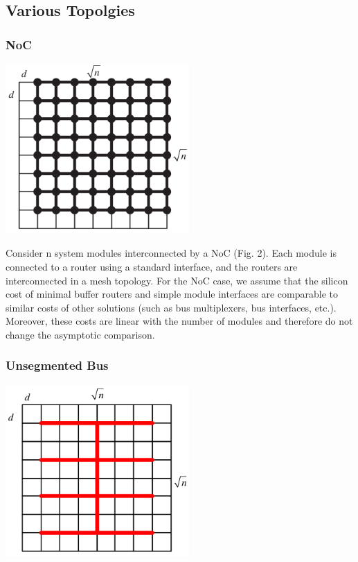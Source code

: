 \subsection{Various Topolgies}


\subsubsection{NoC}

\includegraphics[width=7cm]{images/3}\cite{Bolotin:2004:CCN:1056481.1056484}%

Consider n system modules interconnected by a NoC (Fig. 2). Each module
is connected to a router using a standard interface, and the routers
are interconnected in a mesh topology. For the NoC case, we assume
that the silicon cost of minimal buffer routers and simple module
interfaces are comparable to similar costs of other solutions (such
as bus multiplexers, bus interfaces, etc.). Moreover, these costs
are linear with the number of modules and therefore do not change
the asymptotic comparison. 


\subsubsection{Unsegmented Bus}

\includegraphics[width=7cm]{images/4}\cite{Bolotin:2004:CCN:1056481.1056484}%


